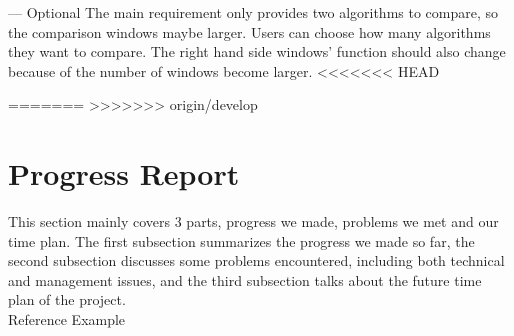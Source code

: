 \documentclass[paper=a4, fontsize=11pt,twoside]{scrartcl}		%
\begin{document}
— Optional
The main requirement only provides two algorithms to compare, so the comparison windows maybe larger. Users can choose how many algorithms they want to compare. The right hand side windows’ function should also change because of the number of windows become larger.
<<<<<<< HEAD

=======
>>>>>>> origin/develop
\clearpage

\section{Progress Report}
This section mainly covers 3 parts, progress we made, problems we met and our time plan. The first subsection summarizes the progress we made so far, the second subsection discusses some problems encountered, including both technical and management issues, and the third subsection talks about the future time plan of the project. \\
Reference Example\cite{Debray:2000:CTC:349214.349233}
\end{document}
